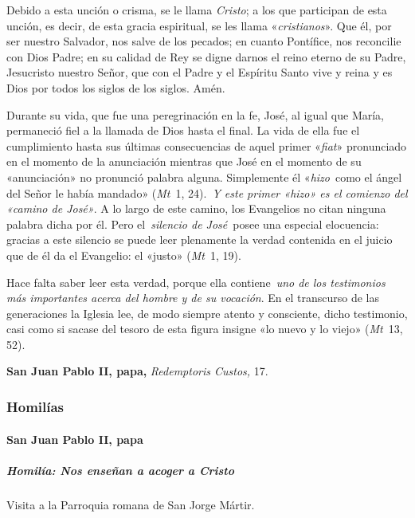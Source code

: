 \documentclass[]{article}
\let\oldparagraph\paragraph
\renewcommand{\paragraph}[1]{\oldparagraph{#1}\mbox{}}
\let\oldsubparagraph\subparagraph
\renewcommand{\subparagraph}[1]{\oldsubparagraph{#1}\mbox{}}
\begin{document}
Debido a esta unción o crisma, se le llama \emph{Cristo}; a los que
participan de esta unción, es decir, de esta gracia espiritual, se les
llama «\emph{cristianos}». Que él, por ser nuestro Salvador, nos salve
de los pecados; en cuanto Pontífice, nos reconcilie con Dios Padre; en
su calidad de Rey se digne darnos el reino eterno de su Padre,
Jesucristo nuestro Señor, que con el Padre y el Espíritu Santo vive y
reina y es Dios por todos los siglos de los siglos. Amén.

Durante su vida, que fue una peregrinación en la fe, José, al igual que
María, permaneció fiel a la llamada de Dios hasta el final. La vida de
ella fue el cumplimiento hasta sus últimas consecuencias de aquel primer
«\emph{fiat}» pronunciado en el momento de la anunciación mientras que
José en el momento de su «anunciación» no pronunció palabra alguna.
Simplemente él «\emph{hizo}~como el ángel del Señor le había mandado»
(\emph{Mt}~1, 24).~\emph{Y este primer «hizo» es el comienzo del «camino
de José»}. A lo largo de este camino, los Evangelios no citan ninguna
palabra dicha por él. Pero el~\emph{silencio de José}~posee una especial
elocuencia: gracias a este silencio se puede leer plenamente la verdad
contenida en el juicio que de él da el Evangelio: el «justo»
(\emph{Mt}~1, 19).~

Hace falta saber leer esta verdad, porque ella contiene~\emph{uno de los
testimonios más importantes acerca del hombre y de su vocación}. En el
transcurso de las generaciones la Iglesia lee, de modo siempre atento y
consciente, dicho testimonio, casi como si sacase del tesoro de esta
figura insigne «lo nuevo y lo viejo» (\emph{Mt}~13, 52).~

\textbf{San Juan Pablo II, papa,} \emph{Redemptoris Custos,} 17.



\subsubsection{Homilías}\label{homiluxedas-3}

\paragraph{San Juan Pablo II, papa}\label{san-juan-pablo-ii-papa-3}

\subparagraph{Homilía: Nos enseñan a acoger a
Cristo}\label{homiluxeda-nos-enseuxf1an-a-acoger-a-cristo}

Visita a la Parroquia romana de San Jorge Mártir.
\end{document}
